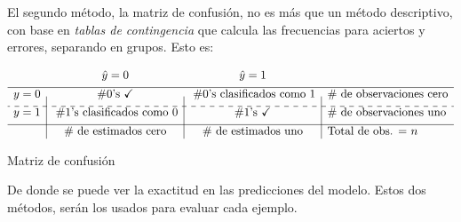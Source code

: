 \documentclass[../Main/Main.tex]{subfiles}
\begin{document}
El segundo método, la matriz de confusión, no es más que un método descriptivo, con base en \textit{tablas de contingencia} que calcula las frecuencias para aciertos y errores, separando en grupos. Esto es:
\begin{table}[H]
\centering
$\begin{array}{c|c|c|l}
~ & \hat{y} = 0 & \hat{y} = 1 & ~ \\[4pt]
\hline
y = 0 & \# 0\text{'s } \checkmark  & \;\# 0\text{'s clasificados como }1 & \#\text{ de observaciones cero} \\[4pt]
\cdashline{1-4}
y = 1 & \;\# 1\text{'s clasificados como }0 & \# 1\text{'s } \checkmark & \#\text{ de observaciones uno} \\[4pt]
\hline
~ & \# \text{ de estimados cero} & \# \text{ de estimados uno} &  \text{Total de obs. = } n
\end{array}$
\caption{Matriz de confusión}
\label{tab:MatrizConfusion}
\end{table}

De donde se puede ver la exactitud en las predicciones del modelo. Estos dos métodos, serán los usados para evaluar cada ejemplo. 
\end{document}
